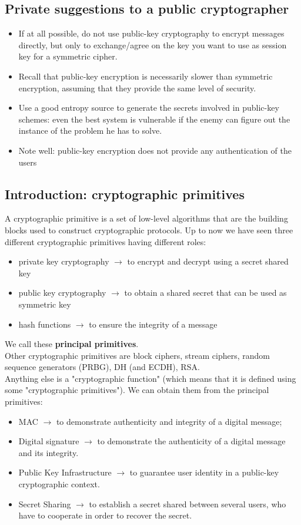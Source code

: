 \documentclass[a4paper, 10pt, titlepage]{article}
\begin{document}
\subsection*{Private suggestions to a public cryptographer}
\begin{itemize}
\item If at all possible, do not use public-key cryptography to encrypt messages directly, but only to exchange/agree on the key you want to use as session key for a symmetric cipher.
\item Recall that public-key encryption is necessarily slower than symmetric encryption, assuming that they provide the same level of security.
\item Use a good entropy source to generate the secrets involved in public-key schemes: even the best system is vulnerable if the enemy can figure out the instance of the problem he has to solve.
\item Note well: public-key encryption does not provide any authentication of the users
\end{itemize}

\subsection{Introduction: cryptographic primitives}
A cryptographic primitive is a set of low-level algorithms that are the building blocks used to construct cryptographic protocols. Up to now we have seen three different cryptographic primitives having different roles:
\begin{itemize}
\item private key cryptography $\rightarrow$ to encrypt and decrypt using a secret shared key
\item public key cryptography $\rightarrow$ to obtain a shared secret that can be used as symmetric key
\item hash functions $\rightarrow$ to ensure the integrity of a message 
\end{itemize}
We call these \textbf{principal primitives}. \\
Other cryptographic primitives are block ciphers, stream ciphers, random sequence generators (PRBG), DH (and ECDH), RSA. \medskip\\
Anything else is a "cryptographic function" (which means that it is defined using some "cryptographic primitives").
We can obtain them from the principal primitives:
\begin{itemize}
\item MAC $\rightarrow$ to demonstrate authenticity and integrity of a digital message;
\item Digital signature $\rightarrow$ to demonstrate the authenticity of a digital message and its integrity.
\item Public Key Infrastructure $\rightarrow$ to guarantee user identity in a public-key cryptographic context.
\item Secret Sharing $\rightarrow$ to establish a secret shared between several users, who have to cooperate in order to recover the secret.
\end{itemize}
\end{document}
